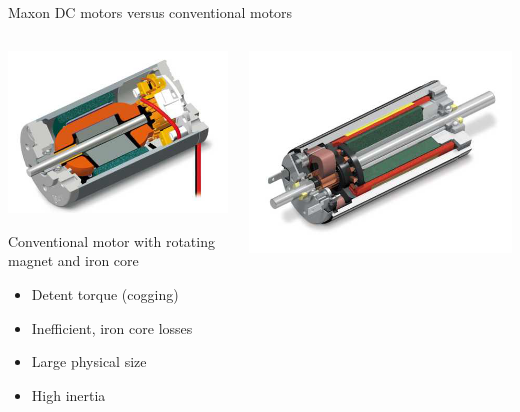 \documentclass[compress]{beamer}
\begin{document}
\begin{frame}{Maxon DC motors versus conventional motors}

    \begin{columns}
        \begin{column}{0.5\linewidth}

            \begin{center}
                \includegraphics[width=0.8\columnwidth]{image46}
            \end{center}

Conventional motor with rotating magnet and iron core

\begin{itemize}

\item Detent torque (cogging)
\item Inefficient, iron core losses
\item Large physical size
\item High inertia
\end{itemize}

        \end{column}
        \begin{column}{0.5\linewidth}

            \begin{center}
                \includegraphics[width=0.8\columnwidth]{image45}
            \end{center}



\end{column}
\end{columns}
\end{frame}
\end{document}
